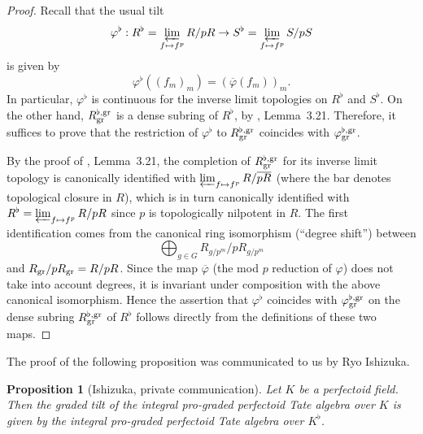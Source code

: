 \documentclass[12pt,twoside,a4paper]{article}
\newtheorem{prop}[thm]{Proposition}
\theoremstyle{definition}
\theoremstyle{remark}
\newcommand\gr{{\rm gr}}
\begin{document}
\begin{proof}Recall that the usual tilt \begin{equation*}\varphi^{\flat}: R^{\flat}=\varprojlim_{f\mapsto f^{p}}R/pR\to S^{\flat}=\varprojlim_{f\mapsto f^{p}}S/pS\end{equation*}is given by \begin{equation*}\varphi^{\flat}((f_{m})_{m})=(\overline{\varphi}(f_{m}))_{m}.\end{equation*}In particular, $\varphi^{\flat}$ is continuous for the inverse limit topologies on $R^{\flat}$ and $S^{\flat}$. On the other hand, $R_{\gr}^{\flat,\gr}$ is a dense subring of $R^{\flat}$, by \cite{Ishizuka-Yoshikawa25}, Lemma~3.21. Therefore, it suffices to prove that the restriction of $\varphi^{\flat}$ to $R_{\gr}^{\flat,\gr}$ coincides with $\varphi_{\gr}^{\flat,\gr}$.

By the proof of \cite{Ishizuka-Yoshikawa25}, Lemma~3.21, the completion of $R_{\gr}^{\flat,\gr}$ for its inverse limit topology is canonically identified with $\varprojlim_{f\mapsto f^{p}}R/\overline{pR}$ (where the bar denotes topological closure in $R$), which is in turn canonically identified with $R^{\flat}=\varprojlim_{f\mapsto f^{p}}R/pR$ since $p$ is topologically nilpotent in $R$. The first identification comes from the canonical ring isomorphism (``degree shift'') between \begin{equation*}\bigoplus_{g\in G}R_{g/p^{m}}/pR_{g/p^{m}}\end{equation*}and $R_{\gr}/pR_{\gr}=R/pR$. Since the map $\overline{\varphi}$ (the mod $p$ reduction of $\varphi$) does not take into account degrees, it is invariant under composition with the above canonical isomorphism. Hence the assertion that $\varphi^{\flat}$ coincides with $\varphi_{\gr}^{\flat,\gr}$ on the dense subring $R_{\gr}^{\flat,\gr}$ of $R^{\flat}$ follows directly from the definitions of these two maps.  \end{proof}
The proof of the following proposition was communicated to us by Ryo Ishizuka. 
\begin{prop}[Ishizuka, private communication]\label{Pro-graded perfectoid Tate algebra and tilting}Let $K$ be a perfectoid field. Then the graded tilt of the integral pro-graded perfectoid Tate algebra over $K$ is given by the integral pro-graded perfectoid Tate algebra over $K^{\flat}$.\end{prop}
\end{document}
